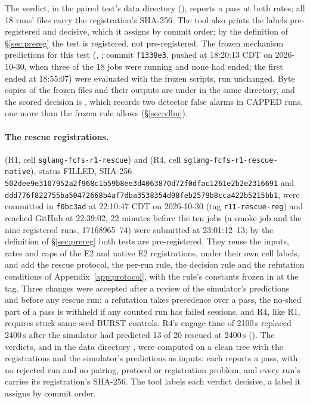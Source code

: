 The verdict,  in the paired test's data directory (), reports a pass at both rates; all 18 runs'  files carry the registration's SHA-256. The tool also prints the labels pre-registered and decisive, which it assigns by commit order; by the definition of \S\ref{sec:prereg} the test is registered, not pre-registered. The frozen mechanism predictions for this test (, ; commit \texttt{f1338e3}, pushed at 18:20:13 CDT on 2026-10-30, when three of the 18 jobs were running and none had ended; the first ended at 18:55:07) were evaluated with the frozen scripts, run unchanged. Byte copies of the frozen files and their outputs are under  in the same directory, and the scored decision is , which records two detector false alarms in CAPPED runs, one more than the frozen rule allows (\S\ref{sec:vllm}).

\paragraph{The rescue registrations.}  (R1, cell \texttt{sglang-fcfs-r1-rescue}) and  (R4, cell \texttt{sglang-fcfs-r1-rescue-native}), status FILLED, SHA-256 \texttt{502dee9e3107952a2f968c1b59b8ee3d\allowbreak 4063870d72f0dfac1261e2b2e2316691} and \texttt{ddd776f822755ba50472668b4af7dba3\allowbreak 538354d98feb2579b8cca422b5215bb1}, were committed in \texttt{f0bc3ad} at 22:10:47 CDT on 2026-10-30 (tag \texttt{r11-rescue-reg}) and reached GitHub at 22:39:02, 22 minutes before the ten jobs (a smoke job and the nine registered runs, 17168965--74) were submitted at 23:01:12--13; by the definition of \S\ref{sec:prereg} both tests are pre-registered. They reuse the inputs, rates and caps of the E2 and native E2 registrations, under their own cell labels, and add the rescue protocol, the per-run rule, the decision rule and the refutation conditions of Appendix~\ref{app:protocol}, with the rule's constants frozen in  at the tag. Three changes were accepted after a review of the simulator's predictions and before any rescue run: a refutation takes precedence over a pass, the no-shed part of a pass is withheld if any counted run has failed sessions, and R4, like R1, requires stuck same-seed BURST controls. R4's engage time of 2100\,s replaced 2400\,s after the simulator had predicted 13 of 20 rescued at 2400\,s (). The verdicts,  and  in the data directory , were computed on a clean tree with the registrations and the simulator's predictions as inputs: each reports a pass, with no rejected run and no pairing, protocol or registration problem, and every run's  carries its registration's SHA-256. The tool labels each verdict decisive, a label it assigns by commit order.

